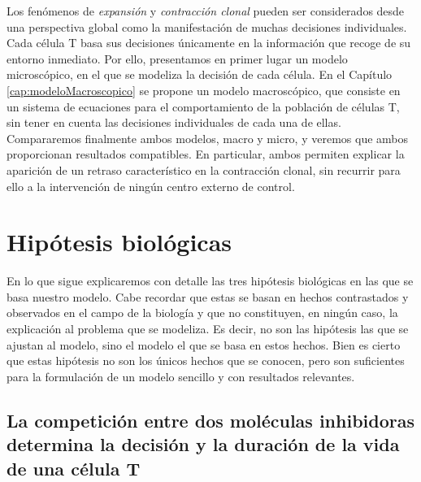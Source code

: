 Los fenómenos de \textit{expansión} y \textit{contracción clonal} pueden ser considerados desde una perspectiva global como la manifestación de muchas decisiones individuales. Cada célula T basa sus decisiones únicamente en la información que recoge de su entorno inmediato. Por ello, presentamos en primer lugar un modelo microscópico, en el que se modeliza la decisión de cada célula. En el Capítulo \ref{cap:modeloMacroscopico} se propone un modelo macroscópico, que consiste en un sistema de ecuaciones para el comportamiento de la población de células T, sin tener en cuenta  las decisiones individuales de cada una de ellas. Compararemos finalmente ambos modelos, macro y micro,  y veremos que ambos proporcionan resultados  compatibles. En particular, ambos permiten explicar la aparición de un retraso característico en la contracción clonal, sin recurrir para ello a la intervención de ningún centro externo de control.


 
\section{Hipótesis biológicas} 
\label{sec:hip_bio}

En lo que sigue explicaremos con detalle las tres hipótesis biológicas en las que se basa nuestro modelo. Cabe recordar que estas se basan en hechos contrastados y observados en el campo de la biología y que no constituyen, en ningún caso, la explicación al problema que se modeliza. Es decir, no son las hipótesis las que se ajustan al modelo, sino el modelo el que se basa en estos hechos.
Bien es cierto que estas hipótesis no son los únicos hechos que se conocen, pero son suficientes para la formulación de un modelo sencillo y con resultados relevantes. %

\subsection{La competición entre dos moléculas inhibidoras determina la decisión y la duración de la vida de una célula T}
\label{subsec:hip_1}
	 
